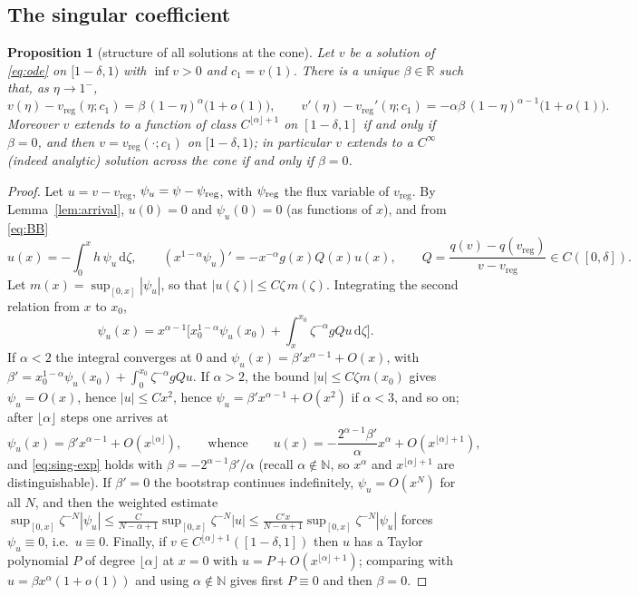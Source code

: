 \documentclass[11pt,a4paper]{amsart}
\newtheorem{proposition}[theorem]{Proposition}
\theoremstyle{definition}
\theoremstyle{remark}
\newcommand{\R}{\mathbb{R}}
\newcommand{\N}{\mathbb{N}}
\newcommand{\vreg}{v_{\mathrm{reg}}}
\newcommand{\dd}{\,\mathrm{d}}
\begin{document}
\subsection{The singular coefficient}
\begin{proposition}[structure of all solutions at the cone]\label{prop:beta-def}
Let $v$ be a solution of \eqref{eq:ode} on $[1-\delta,1)$ with $\inf v>0$ and $c_1=v(1)$.  There is a unique $\beta\in\R$ such that, as $\eta\to1^-$,
\begin{equation}\label{eq:sing-exp}
v(\eta)-\vreg(\eta;c_1)=\beta\,(1-\eta)^{\alpha}\big(1+o(1)\big),\qquad
v'(\eta)-\vreg'(\eta;c_1)=-\alpha\beta\,(1-\eta)^{\alpha-1}\big(1+o(1)\big).
\end{equation}
Moreover $v$ extends to a function of class $C^{\lfloor\alpha\rfloor+1}$ on $[1-\delta,1]$ if and only if $\beta=0$, and then $v=\vreg(\cdot;c_1)$ on $[1-\delta,1)$; in particular $v$ extends to a $C^\infty$ (indeed analytic) solution across the cone if and only if $\beta=0$.
\end{proposition}
\begin{proof}
Let $u=v-\vreg$, $\psi_u=\psi-\psi_{\rm reg}$, with $\psi_{\rm reg}$ the flux variable of $\vreg$.  By Lemma~\ref{lem:arrival}, $u(0)=0$ and $\psi_u(0)=0$ (as functions of $x$), and from \eqref{eq:BB}
\begin{equation}\label{eq:usys}
u(x)=-\int_0^x h\,\psi_u\dd\zeta,\qquad (x^{1-\alpha}\psi_u)'=-x^{-\alpha}g(x)Q(x)u(x),\qquad Q=\frac{q(v)-q(\vreg)}{v-\vreg}\in C([0,\delta]) .
\end{equation}
Let $m(x)=\sup_{[0,x]}|\psi_u|$, so that $|u(\zeta)|\le C\zeta\,m(\zeta)$.  Integrating the second relation from $x$ to $x_0$,
\[
\psi_u(x)=x^{\alpha-1}\Big[x_0^{1-\alpha}\psi_u(x_0)+\int_x^{x_0}\zeta^{-\alpha}gQu\dd\zeta\Big].
\]
If $\alpha<2$ the integral converges at $0$ and $\psi_u(x)=\beta'x^{\alpha-1}+O(x)$, with $\beta'=x_0^{1-\alpha}\psi_u(x_0)+\int_0^{x_0}\zeta^{-\alpha}gQu$.  If $\alpha>2$, the bound $|u|\le C\zeta m(x_0)$ gives $\psi_u=O(x)$, hence $|u|\le Cx^2$, hence $\psi_u=\beta'x^{\alpha-1}+O(x^2)$ if $\alpha<3$, and so on; after $\lfloor\alpha\rfloor$ steps one arrives at
\begin{equation}\label{eq:psiu}
\psi_u(x)=\beta'x^{\alpha-1}+O(x^{\lfloor\alpha\rfloor}),\qquad\text{whence}\qquad u(x)=-\frac{2^{\alpha-1}\beta'}{\alpha}x^{\alpha}+O(x^{\lfloor\alpha\rfloor+1}),
\end{equation}
and \eqref{eq:sing-exp} holds with $\beta=-2^{\alpha-1}\beta'/\alpha$ (recall $\alpha\notin\N$, so $x^\alpha$ and $x^{\lfloor\alpha\rfloor+1}$ are distinguishable).  If $\beta'=0$ the bootstrap continues indefinitely, $\psi_u=O(x^N)$ for all $N$, and then the weighted estimate $\sup_{[0,x]}\zeta^{-N}|\psi_u|\le \frac{C}{N-\alpha+1}\sup_{[0,x]}\zeta^{-N}|u|\le\frac{C'x}{N-\alpha+1}\sup_{[0,x]}\zeta^{-N}|\psi_u|$ forces $\psi_u\equiv0$, i.e.\ $u\equiv0$.  Finally, if $v\in C^{\lfloor\alpha\rfloor+1}([1-\delta,1])$ then $u$ has a Taylor polynomial $P$ of degree $\lfloor\alpha\rfloor$ at $x=0$ with $u=P+O(x^{\lfloor\alpha\rfloor+1})$; comparing with $u=\beta x^\alpha(1+o(1))$ and using $\alpha\notin\N$ gives first $P\equiv0$ and then $\beta=0$.
\end{proof}
\end{document}
